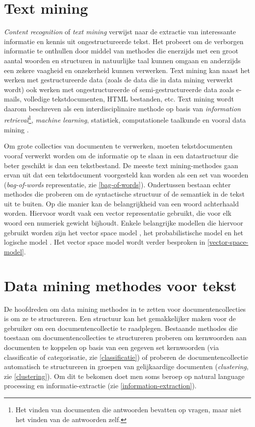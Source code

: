 \section{Text mining}\label{text-mining}
\textit{Content recognition} of \textit{text mining} verwijst naar de extractie van interessante informatie en kennis uit ongestructureerde tekst. Het probeert om de verborgen informatie te onthullen door middel van methodes die enerzijds met een groot aantal woorden en structuren in natuurlijke taal kunnen omgaan en anderzijds een zekere vaagheid en onzekerheid kunnen verwerken. Text mining kan naast het werken met gestructureerde data (zoals de data die in data mining verwerkt wordt) ook werken met ongestructureerde of semi-gestructureerde data zoals e-mails, volledige tekstdocumenten, HTML bestanden, etc. Text mining wordt daarom beschreven als een interdisciplinaire methode op basis van \textit{information retrieval}\footnote{Het vinden van documenten die antwoorden bevatten op vragen, maar niet het vinden van de antwoorden zelf.},\textit{ machine learning}, statistiek, computationele taalkunde en vooral data mining  \cite{Hotho2005}. 

Om grote collecties van documenten te verwerken, moeten tekstdocumenten vooraf verwerkt worden om de informatie op te slaan in een datastructuur die beter geschikt is dan een tekstbestand. De meeste text mining-methodes gaan ervan uit dat een tekstdocument voorgesteld kan worden als een set van woorden (\textit{bag-of-words} representatie, zie \ref{bag-of-words}). Ondertussen bestaan echter methodes die proberen om de syntactische structuur of de semantiek in de tekst uit te buiten. Op die manier kan de belangrijkheid van een woord achterhaald worden. Hiervoor wordt vaak een vector representatie gebruikt, die voor elk woord een numeriek gewicht bijhoudt. Enkele belangrijke modellen die hiervoor gebruikt worden zijn het vector space model \cite{Salton1975}, het probabilistische model \cite{ROBERTSON1977} en het logische model \cite{Rigsbergen1986}. Het vector space model wordt verder besproken in \ref{vector-space-model}.

\section{Data mining methodes voor tekst}
De hoofdreden om data mining methodes in te zetten voor documentencollecties is om ze te structureren. Een structuur kan het gemakkelijker maken voor de gebruiker om een documentencollectie te raadplegen. Bestaande methodes die toestaan om documentencollecties te structureren proberen om kernwoorden aan documenten te koppelen op basis van een gegeven set kernwoorden (via classificatie of categorisatie, zie \ref{classificatie}) of proberen de documentencollectie automatisch te structureren in groepen van gelijkaardige documenten (\textit{clustering}, zie \ref{clustering}). Om dit te bekomen doet men soms beroep op natural language processing en informatie-extractie (zie \ref{information-extraction}).


